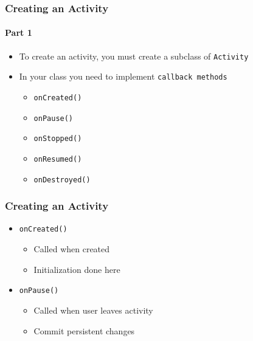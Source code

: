 %
%


\begin{frame}
  \frametitle{Creating an Activity}
  \framesubtitle{Part 1}

  \begin{itemize}
  \item<1-> To create an activity, you must create a subclass of
    \texttt{Activity}

  \item<2-> In your class you need to implement \texttt{callback
      methods}

    \begin{itemize}
    \item<3-> \lstinline{onCreated()}
    \item<4-> \lstinline{onPause()}
    \item<5-> \lstinline{onStopped()}
    \item<6-> \lstinline{onResumed()}
    \item<7-> \lstinline{onDestroyed()}
    \end{itemize}
  \end{itemize}

\end{frame}


\begin{frame}
  \frametitle{Creating an Activity}

  
  \begin{itemize}
  \item<1-> \lstinline{onCreated()}

    \begin{itemize}
    \item<2-> Called when created
    \item<3-> Initialization done here
    \end{itemize}

  \item<4-> \lstinline{onPause()}

    \begin{itemize}
    \item<5-> Called when user leaves activity
    \item<6-> Commit persistent changes
    \end{itemize}

  \end{itemize}

\end{frame}


